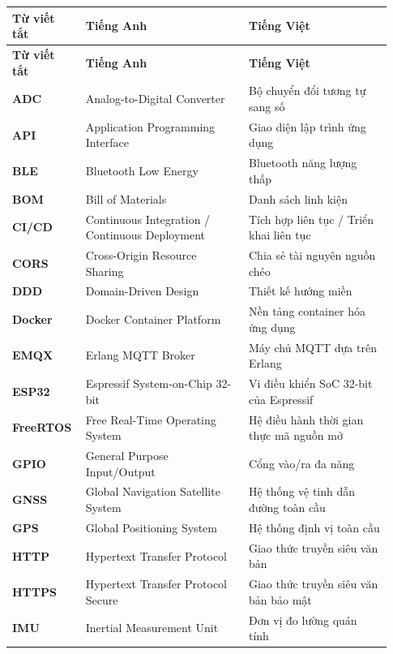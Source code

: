 \documentclass[a4paper]{extarticle}
\newcounter{none} %
\begin{document}
{\def\LTcaptype{none} %
\setlength{\tabcolsep}{4pt}
\begin{longtable}{|L{0.160\linewidth}|L{0.410\linewidth}|L{0.360\linewidth}|}
\hline
\textbf{Từ viết tắt} & \textbf{Tiếng Anh} & \textbf{Tiếng Việt} \\
\hline
\endfirsthead
\hline
\textbf{Từ viết tắt} & \textbf{Tiếng Anh} & \textbf{Tiếng Việt} \\
\hline
\endhead
\hline
\endfoot
\endlastfoot
\textbf{ADC} & Analog-to-Digital Converter & Bộ chuyển đổi tương tự sang
số \\\hline
\textbf{API} & Application Programming Interface & Giao diện lập trình
ứng dụng \\\hline
\textbf{BLE} & Bluetooth Low Energy & Bluetooth năng lượng thấp \\\hline
\textbf{BOM} & Bill of Materials & Danh sách linh kiện \\\hline
\textbf{CI/CD} & Continuous Integration / Continuous Deployment & Tích
hợp liên tục / Triển khai liên tục \\\hline
\textbf{CORS} & Cross-Origin Resource Sharing & Chia sẻ tài nguyên nguồn
chéo \\\hline
\textbf{DDD} & Domain-Driven Design & Thiết kế hướng miền \\\hline
\textbf{Docker} & Docker Container Platform & Nền tảng container hóa ứng
dụng \\\hline
\textbf{EMQX} & Erlang MQTT Broker & Máy chủ MQTT dựa trên Erlang \\\hline
\textbf{ESP32} & Espressif System-on-Chip 32-bit & Vi điều khiển SoC
32-bit của Espressif \\\hline
\textbf{FreeRTOS} & Free Real-Time Operating System & Hệ điều hành thời
gian thực mã nguồn mở \\\hline
\textbf{GPIO} & General Purpose Input/Output & Cổng vào/ra đa năng \\\hline
\textbf{GNSS} & Global Navigation Satellite System & Hệ thống vệ tinh
dẫn đường toàn cầu \\\hline
\textbf{GPS} & Global Positioning System & Hệ thống định vị toàn cầu \\\hline
\textbf{HTTP} & Hypertext Transfer Protocol & Giao thức truyền siêu văn
bản \\\hline
\textbf{HTTPS} & Hypertext Transfer Protocol Secure & Giao thức truyền
siêu văn bản bảo mật \\\hline
\textbf{IMU} & Inertial Measurement Unit & Đơn vị đo lường quán tính \\\hline

\end{longtable}}
\end{document}

